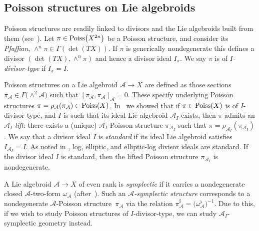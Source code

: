 \documentclass[10pt,a4paper]{amsart}
\numberwithin{equation}{section}
\begin{document}
\subsection{Poisson structures on Lie algebroids} Poisson structures are readily linked to divisors and the Lie algebroids built from them (see~\cite{Klaasse18}). Let $\pi \in {\rm Poiss}\big(X^{2n}\big)$ be a Poisson structure, and consider its \emph{Pfaffian}, $\wedge^n \pi \in \Gamma(\det(TX))$. If $\pi$ is generically nondegenerate this defines a divisor $(\det(TX), \wedge^n \pi)$ and hence a divisor ideal $I_\pi$. We say $\pi$ is of \emph{$I$-divisor-type} if $I_\pi = I$.

Poisson structures on a Lie algebroid $\mathcal{A} \to X$ are defined as those sections $\pi_\mathcal{A} \in \Gamma\big({\wedge}^2 \mathcal{A}\big)$ such that $[\pi_\mathcal{A},\pi_\mathcal{A}]_\mathcal{A} = 0$. These specify underlying Poisson structures $\pi = \rho_\mathcal{A}(\pi_\mathcal{A}) \in {\rm Poiss}(X)$. In~\cite{Klaasse18} we showed that if $\pi \in {\rm Poiss}(X)$ is of $I$-divisor-type, and $I$ is such that its ideal Lie algebroid $\mathcal{A}_I$ exists, then $\pi$ admits an \emph{$\mathcal{A}_I$-lift}: there exists a (unique) $\mathcal{A}_I$-Poisson structure $\pi_{\mathcal{A}_I}$ such that $\pi = \rho_{\mathcal{A}_I}(\pi_{\mathcal{A}_I})$. We say that a divisor ideal $I$ is \emph{standard} if its ideal Lie algebroid satisfies $I_{\mathcal{A}_I} = I$. As noted in \cite{Klaasse18}, log, elliptic, and elliptic-log divisor ideals are standard. If the divisor ideal $I$ is standard, then the lifted Poisson structure $\pi_{\mathcal{A}_I}$ is nondegenerate.

A Lie algebroid $\mathcal{A} \to X$ of even rank is \emph{symplectic} if it carries a nondegenerate closed $\mathcal{A}$-two-form $\omega_\mathcal{A}$ (after~\cite{NestTsygan01}). Such an \emph{$\mathcal{A}$-symplectic structure} corresponds to a nondegenerate $\mathcal{A}$-Poisson structure~$\pi_{\mathcal{A}}$ via the relation $\pi_\mathcal{A}^\sharp = \big(\omega_\mathcal{A}^\flat\big)^{-1}$. Due to this, if we wish to study Poisson structures of $I$-divisor-type, we can study $\mathcal{A}_I$-symplectic geometry instead.
\end{document}
